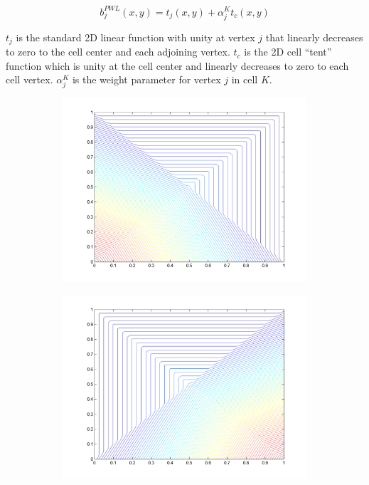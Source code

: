 \begin{equation}
\label{eq::PWL_2D}
	b_j^{PWL} (x,y) = t_j (x,y) + \alpha_j^K t_c (x,y)
\end{equation}

\noindent $t_j$ is the standard 2D linear function with unity at vertex $j$ that linearly decreases to zero to the cell center and each adjoining vertex. $t_c$ is the 2D cell ``tent'' function which is unity at the cell center and linearly decreases to zero to each cell vertex. $\alpha_{j}^{K}$ is the weight parameter for vertex $j$ in cell $K$. 



\pagebreak
\begin{figure}
\label{fig::2D_PWL_unit_square_basis_functions}
\centering
	\begin{subfigure}[b]{0.48\textwidth}
		\centering
		\includegraphics[width=\textwidth]{figures/sec_BF/PWL_square_contour_1.png}
		\caption{}
	\end{subfigure}
	\hfill
	\begin{subfigure}[b]{0.48\textwidth}
		\centering
		\includegraphics[width=\textwidth]{figures/sec_BF/PWL_square_contour_2.png}

\end{subfigure}
\end{figure}
